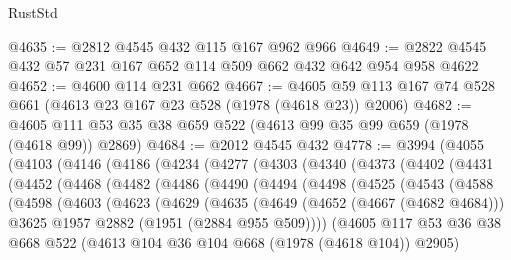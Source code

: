 \begin{lexlean}{RustStd}
\begin{coremodule}
@4635 := @2812 @4545 @432 @115 @167 @962 @966
@4649 := @2822 @4545 @432 @57 @231 @167 @652 @114 @509 @662 @432 @642 @954 @958 @4622
@4652 := @4600 @114 @231 @662
@4667 := @4605 @59 @113 @167 @74 @528 @661 (@4613 @23 @167 @23 @528 (@1978 (@4618 @23)) @2006)
@4682 := @4605 @111 @53 @35 @38 @659 @522 (@4613 @99 @35 @99 @659 (@1978 (@4618 @99)) @2869)
@4684 := @2012 @4545 @432
@4778 := @3994
    (@4055
      (@4103
        (@4146
          (@4186
            (@4234
              (@4277
                (@4303
                  (@4340
                    (@4373
                      (@4402
                        (@4431
                          (@4452
                            (@4468
                              (@4482
                                (@4486
                                  (@4490
                                    (@4494
                                      (@4498
                                        (@4525
                                          (@4543
                                            (@4588
                                              (@4598
                                                (@4603
                                                  (@4623
                                                    (@4629
                                                      (@4635
                                                        (@4649
                                                          (@4652 (@4667 (@4682 @4684)))
                                                          @3625
                                                          @1957
                                                          @2882
                                                          (@1951 (@2884 @955 @509))))
                                                      (@4605
                                                        @117
                                                        @53
                                                        @36
                                                        @38
                                                        @668
                                                        @522
                                                        (@4613
                                                          @104
                                                          @36
                                                          @104
                                                          @668
                                                          (@1978 (@4618 @104))
                                                          @2905)

\end{coremodule}
\end{lexlean}
